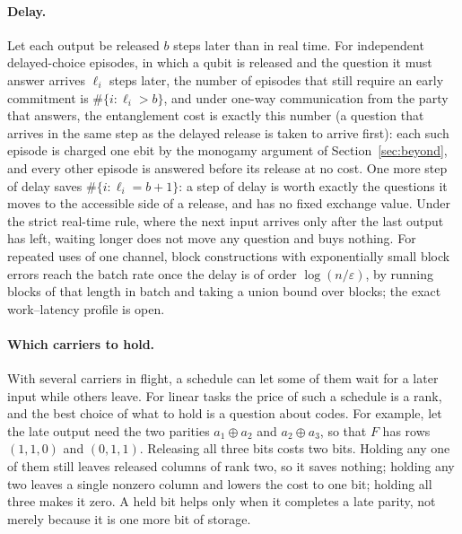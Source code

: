 \documentclass[11pt]{article}
\theoremstyle{definition}
\theoremstyle{remark}
\begin{document}
\paragraph{Delay.} Let each output be released $b$ steps later than in real time. For independent delayed-choice episodes, in which a qubit is released and the question it must answer arrives $\ell_i$ steps later, the number of episodes that still require an early commitment is $\#\{i:\ell_i>b\}$, and under one-way communication from the party that answers, the entanglement cost is exactly this number (a question that arrives in the same step as the delayed release is taken to arrive first): each such episode is charged one ebit by the monogamy argument of Section~\ref{sec:beyond}, and every other episode is answered before its release at no cost. One more step of delay saves $\#\{i:\ell_i=b+1\}$: a step of delay is worth exactly the questions it moves to the accessible side of a release, and has no fixed exchange value. Under the strict real-time rule, where the next input arrives only after the last output has left, waiting longer does not move any question and buys nothing. For repeated uses of one channel, block constructions with exponentially small block errors reach the batch rate once the delay is of order $\log(n/\varepsilon)$, by running blocks of that length in batch and taking a union bound over blocks; the exact work--latency profile is open.

\paragraph{Which carriers to hold.} With several carriers in flight, a schedule can let some of them wait for a later input while others leave. For linear tasks the price of such a schedule is a rank, and the best choice of what to hold is a question about codes. For example, let the late output need the two parities $a_1\oplus a_2$ and $a_2\oplus a_3$, so that $F$ has rows $(1,1,0)$ and $(0,1,1)$. Releasing all three bits costs two bits. Holding any one of them still leaves released columns of rank two, so it saves nothing; holding any two leaves a single nonzero column and lowers the cost to one bit; holding all three makes it zero. A held bit helps only when it completes a late parity, not merely because it is one more bit of storage.
\end{document}
